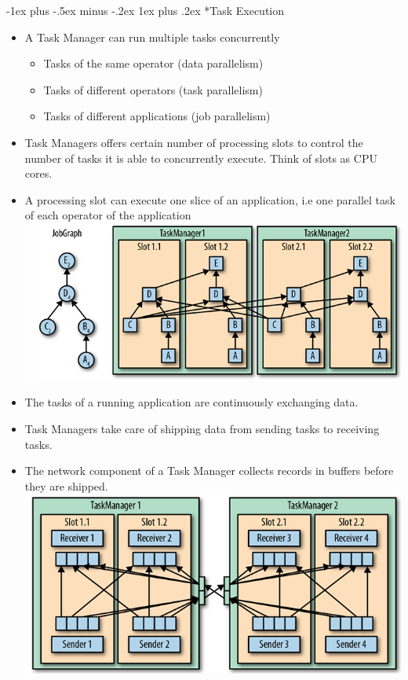 \documentclass[10pt, landscape]{article}
\makeatletter
\renewcommand{\subsubsection}{\@startsection{subsubsection}{3}{0mm}%
  {-1ex plus -.5ex minus -.2ex}%
  {1ex plus .2ex}%
{\normalfont\small\bfseries}}%
\makeatother
\begin{document}
\begin{multicols*}{4}
  \subsubsection*{Task Execution}
  \begin{itemize}
    \item A Task Manager can run multiple tasks concurrently
          \begin{itemize}
            \item Tasks of the same operator (data parallelism)
            \item Tasks of different operators (task parallelism)
            \item Tasks of different applications (job parallelism)
          \end{itemize}
    \item Task Managers offers certain number of processing slots to control the number of tasks it is able to concurrently execute. Think of slots as CPU cores.
    \item A processing slot can execute one slice of an application, i.e one parallel task of each operator of the application
    \includegraphics[width=0.95\linewidth]{flink_task_manager.png}
    \item The tasks of a running application are continuously exchanging data.
    \item Task Managers take care of shipping data from sending tasks to receiving tasks.
    \item The network component of a Task Manager collects records in buffers before they are shipped.
    \includegraphics[width=0.95\linewidth]{flink_network_component.png}
  \end{itemize}
  

\end{multicols*}
\end{document}
